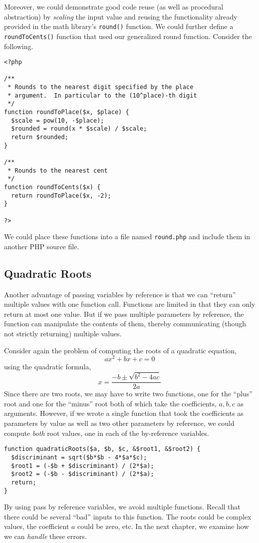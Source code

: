 Moreover, we could demonstrate good code reuse (as well 
as procedural abstraction) by \emph{scaling} the input value 
and reusing the functionality already provided in the math 
library's \texttt{round()} function.  We could further 
define a \texttt{roundToCents()} function that used 
our generalized round function.  Consider the following.

\begin{verbatim}
<?php

/**
 * Rounds to the nearest digit specified by the place
 * argument.  In particular to the (10^place)-th digit
 */
function roundToPlace($x, $place) {
  $scale = pow(10, -$place);
  $rounded = round(x * $scale) / $scale;
  return $rounded;
}

/**
 * Rounds to the nearest cent
 */
function roundToCents($x) {
  return roundToPlace($x, -2);
}

?>
\end{verbatim}

We could place these functions into a file named \texttt{round.php}
and include them in another PHP source file.

\subsection{Quadratic Roots}

Another advantage of passing variables by reference is that we
can ``return'' multiple values with one function call.  Functions
are limited in that they can only return at most one value.  But
if we pass multiple parameters by reference, the function can
manipulate the contents of them, thereby communicating (though
not strictly returning) multiple values.  

Consider again the problem of computing the roots of a quadratic
equation, 
  $$ax^2 + bx + c = 0$$
using the quadratic formula,
 $$x = \frac{-b \pm \sqrt{b^2 - 4ac}}{2a}$$
Since there are two roots, we may have to write two functions, 
one for the ``plus'' root and one for the ``minus'' root both of 
which take the coefficients, $a, b, c$ as arguments.  However,
if we wrote a single function that took the coefficients as parameters
by value as well as two other parameters by reference, we could
compute \emph{both} root values, one in each of the by-reference
variables.

\begin{verbatim}
function quadraticRoots($a, $b, $c, &$root1, &$root2) {
  $discriminant = sqrt($b*$b - 4*$a*$c);
  $root1 = (-$b + $discriminant) / (2*$a);
  $root2 = (-$b - $discriminant) / (2*$a);
  return;
}
\end{verbatim}

By using pass by reference variables, we avoid multiple functions.
Recall that there could be several ``bad'' inputs to this function.  The 
roots could be complex values, the coefficient $a$ could be zero, 
etc.  In the next chapter, we examine how we can \emph{handle}
these errors.






